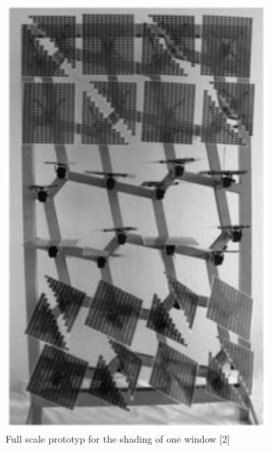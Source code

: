 \begin{figure}[h]
 \centering
 \includegraphics[width=100mm]{graphic/prototype.png}
 \caption{Full scale prototyp for the shading of one window [2]}
 \label{prototype}
\end{figure}